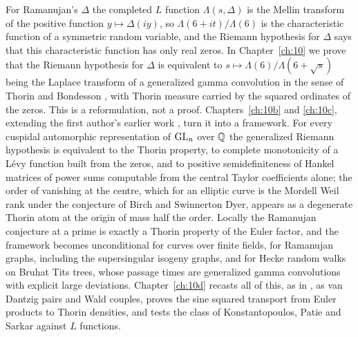 For Ramanujan's $\Delta$ the completed $L$ function $\Lambda(s,\Delta)$ is the Mellin transform of the positive function $y\mapsto\Delta(iy)$, so $\Lambda(6+it)/\Lambda(6)$ is the characteristic function of a symmetric random variable, and the Riemann hypothesis for $\Delta$ says that this characteristic function has only real zeros. In Chapter~\ref{ch:10} we prove that the Riemann hypothesis for $\Delta$ is equivalent to $s\mapsto\Lambda(6)/\Lambda(6+\sqrt s)$ being the Laplace transform of a generalized gamma convolution in the sense of Thorin and Bondesson \cite{thorin1977,bondesson1992}, with Thorin measure carried by the squared ordinates of the zeros. This is a reformulation, not a proof. Chapters~\ref{ch:10b} and \ref{ch:10c}, extending the first author's earlier work \cite{polson2018vdp}, turn it into a framework. For every cuspidal automorphic representation of $\mathrm{GL}_n$ over $\mathbb{Q}$ the generalized Riemann hypothesis is equivalent to the Thorin property, to complete monotonicity of a L\'evy function built from the zeros, and to positive semidefiniteness of Hankel matrices of power sums computable from the central Taylor coefficients alone; the order of vanishing at the centre, which for an elliptic curve is the Mordell Weil rank under the conjecture of Birch and Swinnerton Dyer, appears as a degenerate Thorin atom at the origin of mass half the order. Locally the Ramanujan conjecture at a prime is exactly a Thorin property of the Euler factor, and the framework becomes unconditional for curves over finite fields, for Ramanujan graphs, including the supersingular isogeny graphs, and for Hecke random walks on Bruhat Tits trees, whose passage times are generalized gamma convolutions with explicit large deviations. Chapter~\ref{ch:10d} recasts all of this, as in \cite{polson2018vdp}, as van Dantzig pairs and Wald couples, proves the sine squared transport from Euler products to Thorin densities, and tests the class of Konstantopoulos, Patie and Sarkar \cite{konstantopoulospatiesarkar2024} against $L$ functions.

